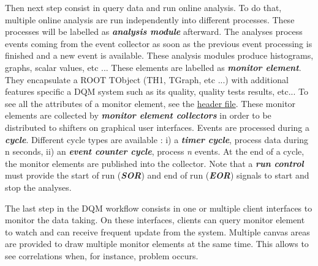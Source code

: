 \documentclass[12pt]{article}
\begin{document}
Then next step consist in query data and run online analysis. To do that, multiple online analysis are run independently into different processes. These processes will be labelled as \textit{\bf analysis module} afterward. The analyses process events coming from the event collector as soon as the previous event processing is finished and a new event is available. These analysis modules produce histograms, graphs, scalar values, etc ... These elements are labelled as \textit{\bf monitor element}. They encapsulate a ROOT TObject (TH1, TGraph, etc ...) with additional features specific a DQM system such as its quality, quality tests results, etc... To see all the attributes of a monitor element, see the \href{https://github.com/DQM4HEP/DQMCore/blob/master/source/include/dqm4hep/DQMMonitorElement.h}{header file}. These monitor elements are collected by \textit{\bf monitor element collectors} in order to be distributed to shifters on graphical user interfaces. Events are processed during a \textit{\bf cycle}. Different cycle types are available : i) a \textit{\bf timer cycle}, process data during n seconds, ii) an \textit{\bf event counter cycle}, process \textit{n} events. At the end of a cycle, the monitor elements are published into the collector. Note that a \textit{\bf run control} must provide the start of run (\textit{\bf SOR}) and end of run (\textit{\bf EOR}) signals to start and stop the analyses.

The last step in the DQM workflow consists in one or multiple client interfaces to monitor the data taking. On these interfaces, clients can query monitor element to watch and can receive frequent update from the system. Multiple canvas areas are provided to draw multiple monitor elements at the same time. This allows to see correlations when, for instance, problem occurs.


\end{document}
